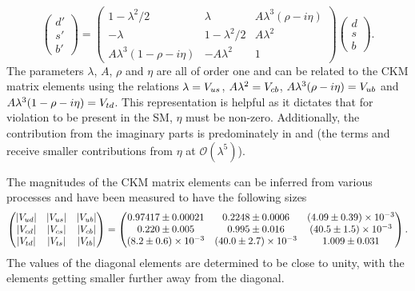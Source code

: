 \begin{equation}
\left( \begin{array}{c} d' \\ s'  \\ b' \end{array} \right) = \begin{pmatrix} 1 - \lambda^2/2 & \lambda & A\lambda^3(\rho-i\eta) \\ -\lambda & 1-\lambda^2/2 & A\lambda^2  \\ A\lambda^3(1-\rho-i\eta) & -A\lambda^2 & 1 \end{pmatrix} \left( \begin{array}{c} d \\ s  \\ b \end{array} \right).
\end{equation}
The parameters $\lambda$, $A$, $\rho$ and $\eta$ are all of order one and can be related to the CKM matrix elements using the relations $\lambda = {V_{{u}{s}}}$, $A\lambda^2 = {V_{{c}{b}}}$, $A\lambda^3(\rho-i\eta) = {V_{{u}{b}}}$ and $A\lambda^3(1-\rho-i\eta) = {V_{{t}{d}}}$.
This representation is helpful as it dictates that for \CP violation to be present in the SM, $\eta$ must be non-zero. Additionally, the contribution from the imaginary parts is predominately in \Vub and \Vtd (the terms \Vcd and \Vts receive smaller contributions from $\eta$ at $\mathcal{O}(\lambda^{5})$). 

The magnitudes of the CKM matrix elements can be inferred from various processes and have been measured to have the following sizes~\cite{PDG2016}
\begin{equation} 
    \begin{pmatrix} 
        |{V_{{u}{d}}}| & |{V_{{u}{s}}}| & |{V_{{u}{b}}}| \\ 
        |{V_{{c}{d}}}| & |{V_{{c}{s}}}| & |{V_{{c}{b}}}|  \\
        |{V_{{t}{d}}}| & |{V_{{t}{s}}}| & |{V_{{t}{b}}}| 
    \end{pmatrix}
    =
    \begin{pmatrix} 
        0.97417\pm0.00021        & 0.2248\pm0.0006           & (4.09\pm0.39)\times10^{-3}\\ 
        0.220\pm0.005            & 0.995\pm0.016             & (40.5\pm1.5)\times10^{-3} \\
        (8.2\pm0.6)\times10^{-3} & (40.0\pm2.7)\times10^{-3} & 1.009\pm0.031            
    \end{pmatrix}.
\end{equation}
The values of the diagonal elements are determined to be close to unity, with the elements getting smaller further away from the diagonal.

